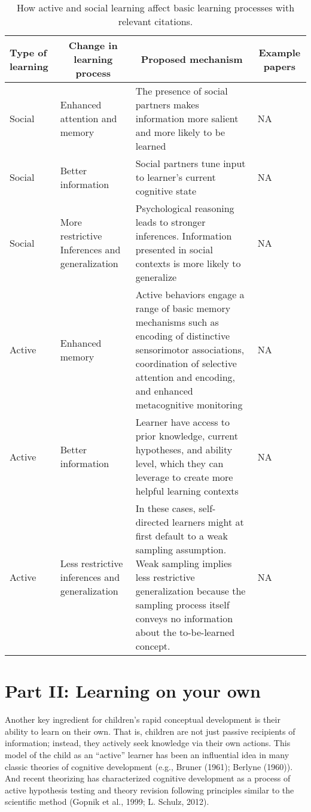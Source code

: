 \documentclass[english,man]{apa6}
\theoremstyle{definition}
\theoremstyle{definition}
\theoremstyle{definition}
\theoremstyle{remark}
\begin{document}
\begin{table}[h]
\begin{center}
\begin{threeparttable}
\caption{\label{tab:learning_overview}How active and social learning affect basic learning processes with relevant citations.}
\begin{tabular}{llll}
\toprule
Type of learning & \multicolumn{1}{c}{Change in learning process} & \multicolumn{1}{c}{Proposed mechanism} & \multicolumn{1}{c}{Example papers}\\
\midrule
Social & Enhanced attention and memory & The presence of social partners makes information more salient and more likely to be learned & NA\\
Social & Better information & Social partners tune input to learner's current cognitive state & NA\\
Social & More restrictive Inferences and generalization & Psychological reasoning leads to stronger inferences. Information presented in social contexts is more likely to generalize & NA\\
Active & Enhanced memory & Active behaviors engage a range of basic memory mechanisms such as encoding of distinctive sensorimotor associations, coordination of selective attention and encoding, and enhanced metacognitive monitoring & NA\\
Active & Better information & Learner have access to prior knowledge, current hypotheses, and ability level, which they can leverage to create more helpful learning contexts & NA\\
Active & Less restrictive inferences and generalization & In these cases, self-directed learners might at first default to a weak sampling assumption. Weak sampling implies less restrictive generalization because the sampling process itself conveys no information about the to-be-learned concept. & NA\\
\bottomrule
\end{tabular}
\end{threeparttable}
\end{center}
\end{table}

\section{Part II: Learning on your
own}\label{part-ii-learning-on-your-own}

Another key ingredient for children's rapid conceptual development is
their ability to learn on their own. That is, children are not just
passive recipients of information; instead, they actively seek knowledge
via their own actions. This model of the child as an \enquote{active}
learner has been an influential idea in many classic theories of
cognitive development (e.g., Bruner (1961); Berlyne (1960)). And recent
theorizing has characterized cognitive development as a process of
active hypothesis testing and theory revision following principles
similar to the scientific method (Gopnik et al., 1999; L. Schulz, 2012).
\end{document}
